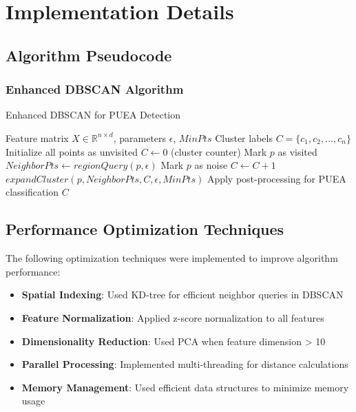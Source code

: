 \chapter{Implementation Details}
\label{app:implementation}

\section{Algorithm Pseudocode}
\label{app:pseudocode}

\subsection{Enhanced DBSCAN Algorithm}
\begin{algorithm}[H]
\caption{Enhanced DBSCAN for PUEA Detection}
\label{alg:enhanced_dbscan}
\begin{algorithmic}[1]
\Require Feature matrix $X \in \mathbb{R}^{n \times d}$, parameters $\epsilon$, $MinPts$
\Ensure Cluster labels $C = \{c_1, c_2, \ldots, c_n\}$
\State Initialize all points as unvisited
\State $C \leftarrow 0$ (cluster counter)
        \State Mark $p$ as visited
        \State $NeighborPts \leftarrow regionQuery(p, \epsilon)$
            \State Mark $p$ as noise
        \Else
            \State $C \leftarrow C + 1$
            \State $expandCluster(p, NeighborPts, C, \epsilon, MinPts)$
        \EndIf
    \EndIf
\EndFor
\State Apply post-processing for PUEA classification
\State \Return $C$
\end{algorithmic}
\end{algorithm}

\section{Performance Optimization Techniques}
\label{app:optimization}

The following optimization techniques were implemented to improve algorithm performance:

\begin{itemize}
    \item \textbf{Spatial Indexing}: Used KD-tree for efficient neighbor queries in DBSCAN
    \item \textbf{Feature Normalization}: Applied z-score normalization to all features
    \item \textbf{Dimensionality Reduction}: Used PCA when feature dimension > 10
    \item \textbf{Parallel Processing}: Implemented multi-threading for distance calculations
    \item \textbf{Memory Management}: Used efficient data structures to minimize memory usage
\end{itemize}

